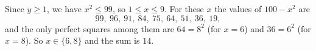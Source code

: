 Since $y\ge1$, we have $x^2\le99$, so $1\le x\le9$. For these $x$ the values of $100-x^2$ are
\[99,\ 96,\ 91,\ 84,\ 75,\ 64,\ 51,\ 36,\ 19,\]
and the only perfect squares among them are $64=8^2$ (for $x=6$) and $36=6^2$ (for $x=8$). So $x\in\{6,8\}$ and the sum is $\boxed{14}$.
